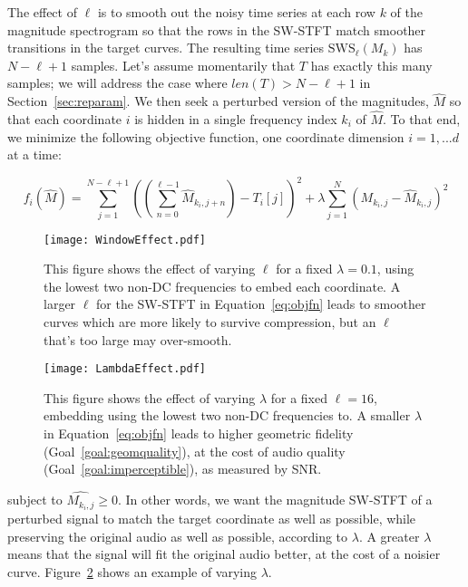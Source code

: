 \documentclass[runningheads]{llncs}
\begin{document}
The effect of $\ell$ is to smooth out the noisy time series at each row $k$ of the magnitude spectrogram so that the rows in the SW-STFT match smoother transitions in the target curves.  The resulting time series $\text{SWS}_{\ell}\left({M_k}\right)$ has $N-\ell+1$ samples.  Let's assume momentarily that $T$ has exactly this many samples; we will address the case where $len(T) > N-\ell+1$ in Section~\ref{sec:reparam}.  We then seek a perturbed version of the magnitudes, $\hat{M}$ so that each coordinate $i$ is hidden in a single frequency index $k_i$ of $\hat{M}$.  To that end, we minimize the following objective function, one coordinate dimension $i = 1, ... d$ at a time:

\begin{equation}
  \label{eq:objfn}
  f_i(\hat{M}) = \sum_{j=1}^{N-\ell+1} \left( \left( \sum_{n = 0}^{\ell-1} \hat{M}_{k_i, j+n} \right) - T_i[j] \right)^2 + \lambda \sum_{j=1}^N \left( M_{k_i, j} - \hat{M}_{k_i, j} \right)^2
\end{equation}



\begin{figure}
  \centering
  \texttt{[image: WindowEffect.pdf]}
  \caption{This figure shows the effect of varying $\ell$ for a fixed $\lambda=0.1$, using the lowest two non-DC frequencies to embed each coordinate.  A larger $\ell$ for the SW-STFT in Equation~\ref{eq:objfn} leads to smoother curves which are more likely to survive compression, but an $\ell$ that's too large may over-smooth.}
  \label{fig:WindowEffect}
\end{figure}

\begin{figure}
  \centering
  \texttt{[image: LambdaEffect.pdf]}
  \caption{This figure shows the effect of varying $\lambda$ for a fixed $\ell=16$, embedding using the lowest two non-DC frequencies to.  A smaller $\lambda$ in Equation~\ref{eq:objfn} leads to higher geometric fidelity (Goal~\ref{goal:geomquality}), at the cost of audio quality (Goal~\ref{goal:imperceptible}), as measured by SNR.}
  \label{fig:LambdaEffect}
\end{figure}



subject to $\hat{M_{k_i, j}} \geq 0$.  In other words, we want the magnitude SW-STFT of a perturbed signal to match the target coordinate as well as possible, while preserving the original audio as well as possible, according to $\lambda$.  A greater $\lambda$ means that the signal will fit the original audio better, at the cost of a noisier curve.  Figure~\ref{fig:LambdaEffect} shows an example of varying $\lambda$.
\end{document}
